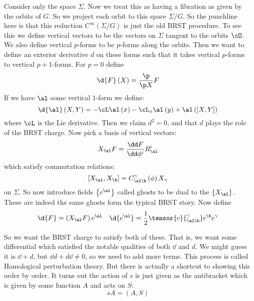 \documentclass{booc}
\begin{document}
Consider only the space $\Sigma$. Now we treat this as having a fibration as given by the orbits
of $G$. So we project each orbit to this space $\Sigma / G$.
So the punchline here is that this reduction $C^\infty\left( \Sigma / G \right)$ is just
the old BRST procedure.
To see this we define vertical vectors to be the 
vectors on $\Sigma$ tangent to the orbits $\cO$.
We also define vertical $p$-forms to be $p$-forms along the orbits. 
Then we want to define an exterior derivative $d$ on these forms such that it 
takes vertical $p$-forms to vertical $p+1$-forms. 
For $p = 0$ define
\begin{equation}
\d{F}\left( X \right) = \frac{\p}{\p X} F
\end{equation}
If we have $\al$ some vertical $1$-form we define:
\begin{equation}
\d{\al}\left( X , Y \right) =
-\cL\al\left( x \right) - \cL_x \al\left( y \right)
+ \al\left( \left[ X , Y \right] \right)
\end{equation}
where $\cL$ is the Lie derivative. 
Then we claim $d^2 = 0$, and that $d$ plays the role of the BRST charge.
Now pick a basis of vertical vectors:
\begin{equation}
X_\al F = \frac{\dd F}{\dd \phi^i} R_\al^i
\end{equation}
which satisfy commutation relations:
\begin{equation}
\left[ X_\al , X_\b \right] = C_{\al \b}^\gamma\left( \phi \right) X_\gamma
\end{equation}
on $\Sigma$. So now introduce fields $\left\{ c^\al \right\}$ called ghosts
to be dual to the $\left\{ X_\al \right\}$. 
These are indeed the same ghosts form the typical BRST story. 
Now define
\begin{align}
\d{F} = \left( X_\al F \right) c^\al
&&
\d{c^\al} = \frac{1}{2} \tensor{c}{_{\al \b}^\gamma} c^\b c^\gamma
\end{align}

So we want the BRST charge to satisfy both of these.
That is, we want some differential which satisfied the notable qualities of both $\dd$ and $d$. 
We might guess it is $\dd + d$, but $\dd d + d \dd \neq 0$, 
so we need to add more terms. This process is called Homological perturbation theory.
But there is actually a shortcut to showing this order by order. 
It turns out the action of $s$ is just given as the antibracket which is given by some function $A$
and acts on $S$:
\begin{equation}
sA = \left( A , S \right)
\end{equation}
\end{document}
